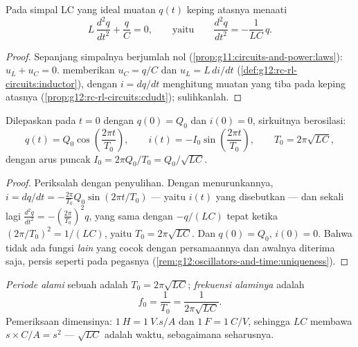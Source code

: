 \begin{proposition}[Persamaan LC]\label{prop:g12:rlc-oscillations:equation}
Pada simpal LC yang ideal muatan $q(t)$ keping atasnya menaati
\[
L\,\frac{d^2q}{dt^2} + \frac{q}{C} = 0,
\qquad\text{yaitu}\qquad
\frac{d^2q}{dt^2} = -\frac{1}{LC}\,q .
\]
\end{proposition}

\begin{proof}
Sepanjang simpalnya  berjumlah nol
(\cref{prop:g11:circuits-and-power:laws}): $u_L + u_C = 0$.
 memberikan $u_C = q/C$ dan  $u_L = L\,di/dt$
(\cref{def:g12:rc-rl-circuits:inductor}), dengan $i = dq/dt$ menghitung
muatan yang tiba pada keping atasnya
(\cref{prop:g12:rc-rl-circuits:cdudt}); sulihkanlah.
\end{proof}

\begin{theorem}\label{thm:g12:rlc-oscillations:oscillation}
Dilepaskan pada $t = 0$ dengan $q(0) = Q_0$ dan $i(0) = 0$, sirkuitnya
berosilasi:
\[
q(t) = Q_0 \cos\!\left(\frac{2\pi t}{T_0}\right),
\qquad
i(t) = -I_0 \sin\!\left(\frac{2\pi t}{T_0}\right),
\qquad
T_0 = 2\pi\sqrt{LC},
\]
dengan arus puncak $I_0 = 2\pi Q_0/T_0 = Q_0/\sqrt{LC}$.
\end{theorem}

\begin{proof}
Periksalah dengan penyulihan. Dengan menurunkannya,
$i = dq/dt = -\frac{2\pi}{T_0} Q_0 \sin(2\pi t/T_0)$ --- yaitu
$i(t)$ yang disebutkan --- dan sekali lagi $\frac{d^2q}{dt^2} = -(\frac{2\pi}{T_0})^2 q$,
yang sama dengan $-q/(LC)$ tepat ketika $(2\pi/T_0)^2 = 1/(LC)$, yaitu
$T_0 = 2\pi\sqrt{LC}$. Dan $q(0) = Q_0$, $i(0) = 0$. Bahwa tidak ada
fungsi \emph{lain} yang cocok dengan persamaannya dan awalnya diterima saja,
persis seperti pada pegasnya
(\cref{rem:g12:oscillators-and-time:uniqueness}).
\end{proof}

\begin{definition}\label{def:g12:rlc-oscillations:period}
\emph{Periode alami} sebuah
 adalah $T_0 = 2\pi\sqrt{LC}$;
\emph{frekuensi alaminya} adalah
\[
f_0 = \frac{1}{T_0} = \frac{1}{2\pi\sqrt{LC}} .
\]
Pemeriksaan dimensinya: $\qty{1}{H} = \qty{1}{V.s/A}$ dan
$\qty{1}{F} = \qty{1}{C/V}$, sehingga $LC$ membawa
$\unit{s} \times \unit{C/A} = \unit{s^2}$ --- $\sqrt{LC}$ adalah waktu,
sebagaimana seharusnya.
\end{definition}

